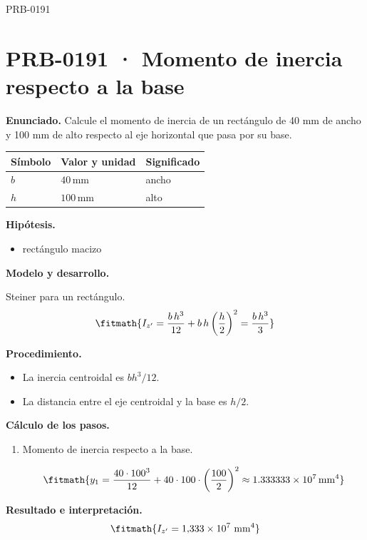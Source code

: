 \begin{studiumworked}{PRB-0191}

\section{PRB-0191 · Momento de inercia respecto a la base}

\textbf{Enunciado.} Calcule el momento de inercia de un rectángulo de 40 mm de ancho y 100 mm de alto respecto al eje horizontal que pasa por su base.

\par\medskip\noindent\begin{tabular}{@{}p{.18\linewidth}p{.26\linewidth}p{.48\linewidth}@{}}
\toprule Símbolo & Valor y unidad & Significado\\\midrule
$b$ & $40\,\mathrm{mm}$ & ancho\\
$h$ & $100\,\mathrm{mm}$ & alto\\
\bottomrule\end{tabular}\par\medskip

\textbf{Hipótesis.}\begin{itemize}\item rectángulo macizo\end{itemize}

\textbf{Modelo y desarrollo.}

Steiner para un rectángulo.\[\fitmath{I_{z'} = \frac{b\,h^{3}}{12} + b\,h\left(\frac{h}{2}\right)^{2} = \frac{b\,h^{3}}{3}}\]

\textbf{Procedimiento.}\begin{itemize}\item La inercia centroidal es $bh^3/12$.
\item La distancia entre el eje centroidal y la base es $h/2$.\end{itemize}

\textbf{Cálculo de los pasos.}

\begin{enumerate}

\item Momento de inercia respecto a la base.

\[\fitmath{y_{1}=\frac{40\cdot {100}^{3}}{12}+40\cdot 100\cdot {\left(\frac{100}{2}\right)}^{2}\approx 1.333333\times10^{7}\,\mathrm{mm^{4}}}\]

\end{enumerate}

\textbf{Resultado e interpretación.}\[\fitmath{I_{z'} = 1{,}333\times 10^{7}\ \mathrm{mm}^{4}}\]


\end{studiumworked}
